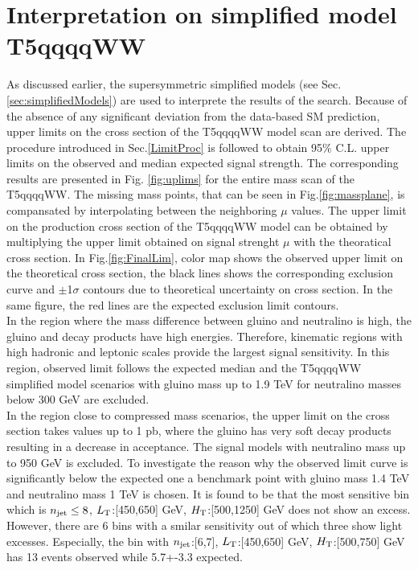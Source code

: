 \section{Interpretation on simplified model T5qqqqWW}
As discussed earlier, the supersymmetric simplified models (see Sec.\ref{sec:simplifiedModels}) are used to interprete the results of the search. Because of the absence of any significant deviation from the data-based SM prediction, upper limits  on the cross section of the T5qqqqWW model scan are derived.  
The procedure introduced in Sec.\ref{LimitProc} is followed to obtain 95\% C.L. upper limits on the observed and median expected signal strength. The corresponding results are presented in Fig. \ref{fig:uplims} for the entire mass scan of the T5qqqqWW. The missing mass points, that can be seen in Fig.\ref{fig:massplane}, is compansated by interpolating between the neighboring $\mu$ values.
The upper limit on the production cross section of the T5qqqqWW model can be obtained by multiplying the upper limit obtained on signal strenght $\mu$ with the theoratical cross section.
In Fig.\ref{fig:FinalLim}, color map shows the observed upper limit on the theoretical cross section, the black lines shows the corresponding exclusion curve and $\pm$1$\sigma$ contours due to theoretical uncertainty on cross section. In the same figure, the red lines are the expected exclusion limit contours. \\
In the region where the mass difference between gluino and neutralino is high, the gluino and decay products have high energies. Therefore, kinematic regions with high hadronic and leptonic scales provide the largest signal sensitivity. In this region, observed limit follows the expected median and the T5qqqqWW simplified model scenarios with gluino mass up to 1.9 TeV for neutralino masses below 300 GeV  are excluded. \\
In the region close to compressed mass scenarios, the upper limit on the cross section takes values up to 1 pb, where the gluino has very soft decay products resulting in a decrease in acceptance. The signal  models with neutralino mass up to 950 GeV is excluded.
To investigate the reason why the observed limit curve is significantly below the expected one a benchmark point with gluino mass 1.4 TeV and neutralino mass 1 TeV is chosen. It is found to be that the most sensitive bin which is $n_{\rm jet} \leq 8$, $L_{\rm T}$:[450,650] GeV, $H_{\rm T}$:[500,1250] GeV does not show an excess. However, there are 6 bins with a smilar sensitivity out of which three show light excesses. Especially, the bin with $n_{\rm jet}$:[6,7], $L_{\rm T}$:[450,650] GeV, $H_{\rm T}$:[500,750] GeV has 13 events observed while 5.7+-3.3 expected.
